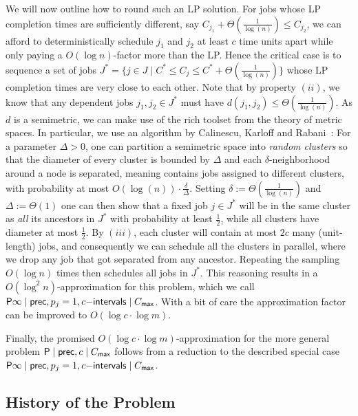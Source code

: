 We will now outline how to round such an LP solution. 
For jobs whose LP completion times are sufficiently different, say $C_{j_1} + \Theta(\frac{1}{\log(n)}) \leq C_{j_2}$,
we can afford to deterministically schedule $j_1$ and $j_2$ at least $c$ time units apart while only paying a $O(\log n)$-factor more than the LP. Hence the critical case is to sequence a set of jobs $J^* = \{ j \in J \mid C^* \leq C_j \leq C^* + \Theta(\frac{1}{\log(n)}) \}$
whose LP completion times are very close to each other. Note that by property $(ii)$, we know that any dependent jobs $j_1,j_2 \in J^*$ must have $d(j_1,j_2) \leq \Theta(\frac{1}{\log(n)})$.
As $d$ is a semimetric, we can make use of the rich toolset from the theory of metric spaces. 
In particular, we use an algorithm by Calinescu, Karloff and Rabani~\cite{DBLP:journals/siamcomp/CalinescuKR04}: 
For a parameter $\Delta>0$, one can partition a semimetric space into \emph{random clusters} so that the
diameter of every cluster is bounded by $\Delta$ and each $\delta$-neighborhood around a node is separated, 
meaning contains jobs assigned to different clusters, 
with probability at most  $O(\log(n)) \cdot \frac{\delta}{\Delta}$.
Setting $\delta := \Theta(\frac{1}{\log(n)})$ and $\Delta := \Theta(1)$ one can then show that a fixed job $j \in J^*$ will be
in the same cluster as \emph{all} its ancestors in $J^*$ with probability at least $\frac{1}{2}$, while all clusters have diameter at most $\frac{1}{2}$. By $(iii)$, each cluster will contain at most $2c$ many (unit-length) jobs, and consequently we can schedule all the clusters in parallel, where we drop any job that got separated from any ancestor.
Repeating the sampling $O(\log n)$ times then schedules all jobs in $J^*$. This reasoning results in a $O(\log^2 n)$-approximation
for this problem, which we call $\mathsf{P} \infty \mid \mathsf{prec}, p_j=1, c\mathsf{-intervals} \mid C_{\mathsf{max}}$. With a bit of care the approximation factor can be improved to $O(\log c \cdot \log m)$.

Finally, the promised $O(\log c \cdot \log m)$-approximation for the more general problem $\mathsf{P} \mid \mathsf{prec}, c \mid C_{\mathsf{max}}$
follows from a reduction to the described special case $\mathsf{P} \infty \mid \mathsf{prec}, p_j=1, c\mathsf{-intervals} \mid C_{\mathsf{max}}$.



\subsection{History of the Problem} \label{sec:related_work}

